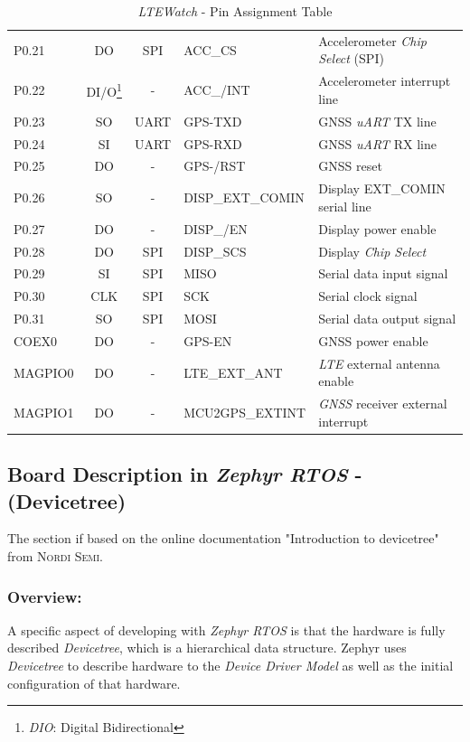\documentclass[report.tex]{subfiles}
\begin{document}
\begin{table}[H]
{\begin{tabular}{l c c l l}
P0.21  & DO & SPI & ACC\_CS & Accelerometer \textit{Chip Select} (SPI)\\
P0.22  & DI/O\footnote{\textit{DIO}: Digital Bidirectional} & - & ACC\_/INT & Accelerometer interrupt line\\
P0.23  & SO & UART & GPS-TXD & GNSS \textit{uART} TX line\\
P0.24  & SI & UART & GPS-RXD & GNSS \textit{uART} RX line\\
P0.25  & DO & - & GPS-/RST & GNSS reset\\
P0.26  & SO & - & DISP\_EXT\_COMIN & Display EXT\_COMIN serial line\\
P0.27  & DO & - & DISP\_/EN & Display power enable\\
P0.28  & DO & SPI & DISP\_SCS & Display \textit{Chip Select}\\
P0.29  & SI & SPI & MISO & Serial data input signal\\
P0.30  & CLK & SPI & SCK & Serial clock signal\\
P0.31  & SO & SPI & MOSI & Serial data output signal\\
COEX0  & DO & - & GPS-EN & GNSS power enable\\
MAGPIO0 & DO & - & LTE\_EXT\_ANT & \textit{LTE} external antenna enable \\
MAGPIO1 & DO & - & MCU2GPS\_EXTINT & \textit{GNSS} receiver external interrupt\\
\end{tabular}}
\caption{\textit{LTEWatch} - Pin Assignment Table}
\label{tab:gpio_ltewatch_board}
\end{table}

\subsection{Board Description in \textit{Zephyr RTOS} - (Devicetree)}

The section if based on the online documentation "Introduction to devicetree"\cite{dtinro} from \textsc{Nordi Semi.}

\subsubsection{Overview:}
A specific aspect of developing with \textit{Zephyr RTOS} is that the hardware is fully described \textit{Devicetree}, which is a hierarchical data structure. Zephyr uses \textit{Devicetree} to
describe hardware to the \textit{Device Driver Model} as well as the initial configuration of that hardware.
\end{document}
